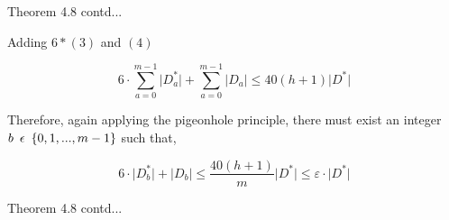 \documentclass{beamer}
\begin{document}
\begin{frame}{Theorem 4.8 contd...}


\begin{exampleblock}{Adding $6*(3)$ and $(4)$}

    \begin{equation}
            6 \cdot \displaystyle \sum_{a=0}^{m-1} \lvert D_a^* \rvert + \displaystyle \sum_{a=0}^{m-1} \lvert D_a \rvert \le 40( h+1 )\lvert D^* \rvert   
    \end{equation}


    

\end{exampleblock}

\begin{exampleblock}{}

    Therefore, again applying the pigeonhole principle, there must exist an integer $b \hspace{0.5em} \epsilon \hspace{0.5em} \{0, 1,...,m - 1\}$ such that,

    \begin{equation}
            6 \cdot \lvert D_b^* \rvert + \lvert D_b \rvert \le \frac{40( h+1 )}{m}\lvert D^* \rvert  \le \varepsilon \cdot \lvert D^* \rvert
    \end{equation}


    

\end{exampleblock}



\end{frame}

\begin{frame}{Theorem 4.8 contd...}



\end{frame}
\end{document}
